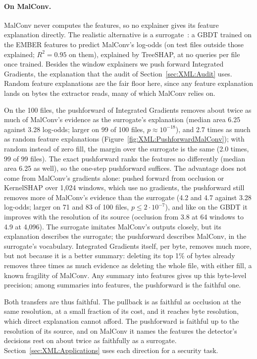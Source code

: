 

\paragraph{On MalConv.} MalConv never computes the features, so no explainer gives its feature explanation directly.
The realistic alternative is a surrogate~\cite{craven1996extracting, frosst2017distilling, jacobs2022ai}: a GBDT trained
on the EMBER features to predict MalConv's log-odds (on test files outside those explained; $R^2 = 0.95$ on them),
explained by TreeSHAP, at no queries per file once trained. Besides the window explainers we push forward Integrated
Gradients, the explanation that the audit of Section~\ref{sec:XML:Audit} uses. Random feature explanations are the
fair floor here, since any feature explanation lands on bytes the extractor reads, many of which MalConv relies on.



On the 100 files, the pushforward of Integrated Gradients removes about twice as much of MalConv's evidence as the
surrogate's explanation (median area 6.25 against 3.28 log-odds; larger on 99 of 100 files, $p \approx 10^{-18}$), and
2.7 times as much as random feature explanations (Figure~\ref{fig:XML:PushforwardMalConv}); with random instead of zero
fill, the margin over the surrogate is the same (2.0 times, 99 of 99 files). The exact pushforward ranks the features no
differently (median area 6.25 as well), so the one-step pushforward suffices. The advantage does not come from
MalConv's gradients alone: pushed forward from occlusion or KernelSHAP over 1{,}024 windows, which use no
gradients, the pushforward still removes more of MalConv's evidence than the surrogate (4.2 and 4.7 against 3.28
log-odds; larger on 71 and 83 of 100 files, $p \leq 2 \cdot 10^{-7}$), and like on the GBDT it improves with the
resolution of its source (occlusion from 3.8 at 64 windows to 4.9 at 4{,}096). The surrogate imitates MalConv's outputs
closely, but its explanation describes the surrogate; the pushforward describes MalConv, in the surrogate's vocabulary.
Integrated Gradients itself, per byte, removes much more, but not because it is a better summary: deleting its top 1\%
of bytes already removes three times as much evidence as deleting the whole file, with either fill, a known fragility
of MalConv. Any summary into features gives up this byte-level precision; among summaries into features, the
pushforward is the faithful one.

Both transfers are thus faithful. The pullback is as faithful as occlusion at the same
resolution, at a small fraction of its cost, and it reaches byte resolution, which direct explanation cannot afford.
The pushforward is faithful up to the resolution of its source, and on MalConv it names the features the detector's
decisions rest on about twice as faithfully as a surrogate. Section~\ref{sec:XML:Applications} uses each direction for
a security task.